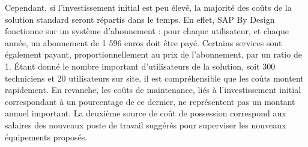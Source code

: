 Cependant, si l’investissement initial est peu élevé, la majorité des coûts de la solution standard seront répartis dans le temps. En effet, SAP By Design fonctionne sur un système d’abonnement : pour chaque utilisateur, et chaque année, un abonnement de 1 596 euros doit être payé. Certains services sont également payant, proportionnellement au prix de l’abonnement, par un ratio de 1. Étant donné le nombre important d’utilisateurs de la solution, soit 300 techniciens et 20 utilisateurs sur site, il est compréhensible que les coûts montent rapidement. En revanche, les coûts de maintenance, liés à l’investissement initial correspondant à un pourcentage de ce dernier, ne représentent pas un montant annuel important. La deuxième source de coût de possession correspond aux salaires des nouveaux poste de travail suggérés pour superviser les nouveaux équipements proposés.


\begin{figure}[H]
    \noindent{}
\end{figure}

\begin{figure}[H]
    \noindent{}
\end{figure}



